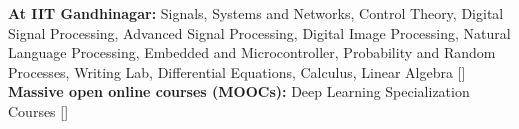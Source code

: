 
\begin{cvparagraph}

\textbf{At IIT Gandhinagar:} Signals, Systems and Networks, Control Theory, Digital Signal Processing, Advanced Signal Processing, Digital Image Processing, Natural Language Processing, Embedded and Microcontroller, Probability and
Random Processes, Writing Lab, Differential Equations, Calculus, Linear Algebra [\textbf{}]\vspace{0.2cm}\\
\textbf{Massive open online courses (MOOCs):} Deep Learning Specialization Courses [\textbf{}]
\end{cvparagraph}

